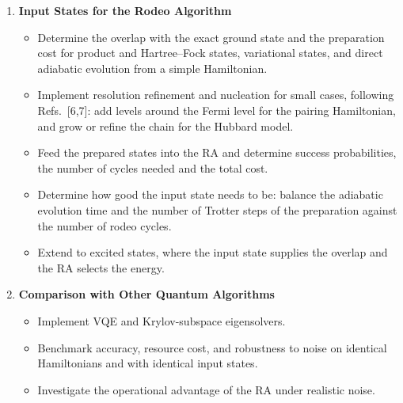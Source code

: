 \documentclass[12pt,a4paper]{article}
\begin{document}
\begin{enumerate}
\item \textbf{Input States for the Rodeo Algorithm}
  \begin{itemize}
    \item Determine the overlap with the exact ground state and the preparation cost for product and Hartree--Fock states, variational states, and direct adiabatic evolution from a simple Hamiltonian.
    \item Implement resolution refinement and nucleation for small cases, following Refs.~[6,7]: add levels around the Fermi level for the pairing Hamiltonian, and grow or refine the chain for the Hubbard model.
    \item Feed the prepared states into the RA and determine success probabilities, the number of cycles needed and the total cost.
    \item Determine how good the input state needs to be: balance the adiabatic evolution time and the number of Trotter steps of the preparation against the number of rodeo cycles.
    \item Extend to excited states, where the input state supplies the overlap and the RA selects the energy.
  \end{itemize}

\item \textbf{Comparison with Other Quantum Algorithms}
  \begin{itemize}
    \item Implement VQE and Krylov-subspace eigensolvers.
    \item Benchmark accuracy, resource cost, and robustness to noise on identical Hamiltonians and with identical input states.
    \item Investigate the operational advantage of the RA under realistic noise.
  \end{itemize}


\end{enumerate}
\end{document}
